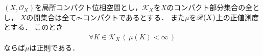 		\begin{screen}
			\begin{thm}[$C_c(X)$上のRieszの表現定理]
			\end{thm}
		\end{screen}
		
		\begin{screen}
			\begin{thm}[正値Borel測度の正則性定理]
				$(X,\mathscr{O}_X)$を局所コンパクト位相空間とし，$\mathscr{K}_X$を$X$のコンパクト部分集合の全とし，
				$X$の開集合は全て$\sigma$-コンパクトであるとする．
				また$\mu$を$\mathscr{B}(X)$上の正値測度とする．
				このとき
				\begin{align}
					\forall K \in \mathscr{K}_X\, \left(\, \mu(K) < \infty\, \right)
				\end{align}
				ならば$\mu$は正則である．
			\end{thm}
		\end{screen}
		
